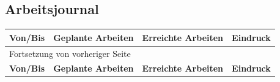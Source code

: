 \newpage
\begin{landscape}
\subsection{Arbeitsjournal}
\label{sec:orgbda3d36}

\begin{longtable}{|p{2cm}|p{5cm}|p{5cm}|p{7cm}|}
\hline
\textbf{Von/Bis}\cellcolor[HTML]{C0C0C0} & \textbf{Geplante Arbeiten}\cellcolor[HTML]{C0C0C0} & \textbf{Erreichte Arbeiten}\cellcolor[HTML]{C0C0C0} & \textbf{Eindruck}\cellcolor[HTML]{C0C0C0}\\
\hline
\endfirsthead
\multicolumn{4}{l}{Fortsetzung von vorheriger Seite} \\
\hline

\textbf{Von/Bis}\cellcolor[HTML]{C0C0C0} & \textbf{Geplante Arbeiten}\cellcolor[HTML]{C0C0C0} & \textbf{Erreichte Arbeiten}\cellcolor[HTML]{C0C0C0} & \textbf{Eindruck}\cellcolor[HTML]{C0C0C0} \\


\end{longtable}
\end{landscape}
